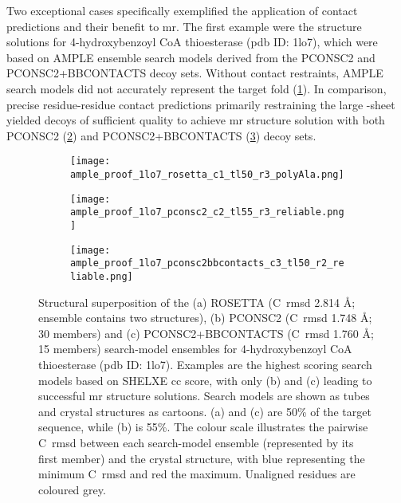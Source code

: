 Two exceptional cases specifically exemplified the application of contact predictions and their benefit to \gls{mr}. The first example were the structure solutions for 4-hydroxybenzoyl CoA thioesterase (\gls{pdb} ID: 1lo7), which were based on AMPLE ensemble search models derived from the PCONSC2 and PCONSC2+BBCONTACTS decoy sets. Without contact restraints, AMPLE search models did not accurately represent the target fold (\cref{fig:ample_proof_1lo7_rosetta}). In comparison, precise residue-residue contact predictions primarily restraining the large \textbeta-sheet yielded decoys of sufficient quality to achieve \gls{mr} structure solution with both PCONSC2 (\cref{fig:ample_proof_1lo7_pconsc2}) and PCONSC2+BBCONTACTS (\cref{fig:ample_proof_1lo7_pconsc2bbcontacts}) decoy sets.

\begin{figure}[H]
    \centering
    \begin{subfigure}[b]{0.32\textwidth}
        \centering
        \texttt{[image: ample\_proof\_1lo7\_rosetta\_c1\_tl50\_r3\_polyAla.png]}
        \caption{}
        \label{fig:ample_proof_1lo7_rosetta}
    \end{subfigure}
    \begin{subfigure}[b]{0.32\textwidth}
        \centering
        \texttt{[image: ample\_proof\_1lo7\_pconsc2\_c2\_tl55\_r3\_reliable.png]}
        \caption{}
        \label{fig:ample_proof_1lo7_pconsc2}
    \end{subfigure}
    \begin{subfigure}[b]{0.32\textwidth}
        \centering
        \texttt{[image: ample\_proof\_1lo7\_pconsc2bbcontacts\_c3\_tl50\_r2\_reliable.png]}
        \caption{}
        \label{fig:ample_proof_1lo7_pconsc2bbcontacts}
    \end{subfigure}

    \caption[Structural superposition of three search models for target 1lo7]{Structural superposition of the (a) ROSETTA (C\textalpha\ \gls{rmsd} 2.814 \AA; ensemble contains two structures), (b) PCONSC2 (C\textalpha\ \gls{rmsd} 1.748 \AA; 30 members) and (c) PCONSC2+BBCONTACTS (C\textalpha\ \gls{rmsd} 1.760 \AA; 15 members) search-model ensembles for 4-hydroxybenzoyl CoA thioesterase (\gls{pdb} ID: 1lo7). Examples are the highest scoring search models based on SHELXE \gls{cc} score, with only (b) and (c) leading to successful \gls{mr} structure solutions. Search models are shown as tubes and crystal structures as cartoons. (a) and (c) are 50\% of the target sequence, while (b) is 55\%. The colour scale illustrates the pairwise C\textalpha\ \gls{rmsd} between each search-model ensemble (represented by its first member) and the crystal structure, with blue representing the minimum C\textalpha\ \gls{rmsd} and red the maximum. Unaligned residues are coloured grey.}
    \label{fig:ample_proof_example_1lo7}
\end{figure}

